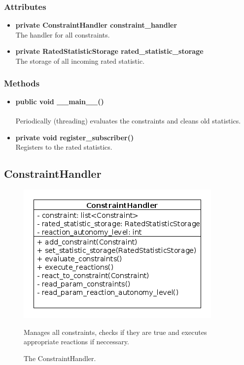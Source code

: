 \subsubsection{Attributes}
\begin{itemize}
	\item \textbf{ private ConstraintHandler constraint\_handler}\\
		The handler for all constraints.
	\item \textbf{ private RatedStatisticStorage rated\_statistic\_storage}\\
		The storage of all incoming rated statistic.
\end{itemize}
\subsubsection{Methods}
\begin{itemize}
	\item \textbf{ public void \_\_main\_\_() }\\\\
		Periodically (threading) evaluates the constraints and cleans old statistics.
	\item \textbf{ private void register\_subscriber() }\\
		Registers to the rated statistics.
\end{itemize}


\newpage
\subsection{ConstraintHandler}
\begin{figure}[htbp]
	\begin{minipage}[t]{8cm}
		\vspace{0pt}
		\centering
		\includegraphics[scale=0.6]{./diagram_pictures/reactor/ConstraintHandler.png}
		\caption{The ConstraintHandler.}
	\end{minipage}
	\hfill
	\begin{minipage}[t]{8cm}
		\vspace{10pt}
			Manages all constraints, checks if they are true and executes appropriate reactions if neccessary.
	\end{minipage}
\end{figure}  


